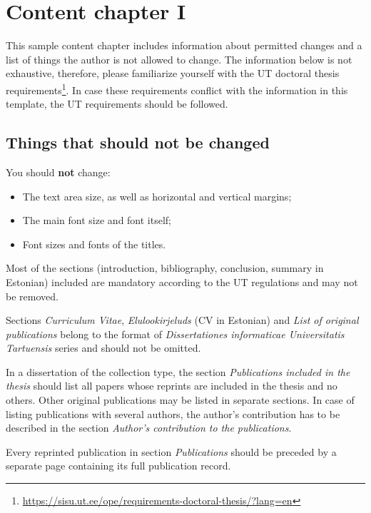 \chapter{Content chapter I}
\label{chapterI}

This sample content chapter includes information about permitted changes and a list of things the author is not allowed to change. The information below is not exhaustive, therefore, please familiarize yourself with the UT doctoral thesis requirements\footnote{\url{https://sisu.ut.ee/ope/requirements-doctoral-thesis/?lang=en}}. In case these requirements conflict with the information in this template, the UT requirements should be followed.

\section{Things that should not be changed}

You should \textbf{not} change:

\begin{itemize}
    \item The text area size, as well as horizontal and vertical margins;
    \item The main font size and font itself;
    \item Font sizes and fonts of the titles.
\end{itemize}

Most of the sections (introduction, bibliography, conclusion, summary in Estonian) included are mandatory according to the UT regulations and may not be removed.

Sections \textit{Curriculum Vitae}, \textit{Elulookirjeluds} (CV in Estonian) and \textit{List of original publications} belong to the format of \textit{Dissertationes informaticae Universitatis Tartuensis} series and should not be omitted.

In a dissertation of the collection type, the section \textit{Publications included in the thesis} should list all papers whose reprints are included in the thesis and no others. Other original publications may be listed in separate sections. In case of listing publications with several authors, the author's contribution has to be described in the section \textit{Author’s contribution to the publications}.

Every reprinted publication in section \textit{Publications} should be preceded by a separate page containing its full publication record.


